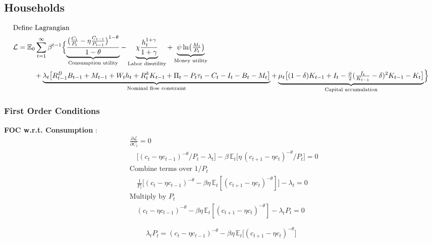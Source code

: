 \documentclass[11pt,preprint]{elsarticle}
\numberwithin{equation}{section}
\numberwithin{figure}{section}
\numberwithin{table}{section}
\begin{document}
\subsection{Households}\label{households-1}

\begin{align*}
  & \text{Define Lagrangian} \\
  & \mathcal{L} = \mathbb{E}_0 \sum_{t=1}^{\infty} \beta^{t-1} \Bigl\{
    \underbrace{\frac{\bigl(\tfrac{C_t}{P_t}-\eta\tfrac{C_{t-1}}{P_{t-1}}\bigr)^{1-\theta}}{1-\theta}}_{\text{Consumption utility}}
    - \underbrace{\chi\frac{h_t^{1+\gamma}}{1+\gamma}}_{\text{Labor disutility}}
    + \underbrace{\psi\ln\bigl(\tfrac{M_t}{P_t}\bigr)}_{\text{Money utility}} \\
  & \quad\qquad
    + \underbrace{\lambda_t\bigl[R^B_{t-1}B_{t-1}+M_{t-1}+W_th_t+R^k_tK_{t-1}+\Pi_t-P_t\tau_t-C_t-I_t-B_t-M_t\bigr]}_{\text{Nominal flow constraint}}
    + \underbrace{\mu_t\bigl[(1-\delta)K_{t-1}+I_t-\tfrac{\phi}{2}(\tfrac{I_t}{K_{t-1}}-\delta)^2K_{t-1}-K_t\bigr]}_{\text{Capital accumulation}}
  \Bigr\}
\end{align*}

\subsubsection{\texorpdfstring{First Order Conditions
\label{household_FOC}}{First Order Conditions }}\label{first-order-conditions}

\textbf{FOC w.r.t. Consumption} : \begin{align*}
  & \frac{\partial \mathcal{L}}{\partial C_t} = 0 \\
  & \quad \bigl[(c_t-\eta c_{t-1})^{-\theta}/P_t - \lambda_t\bigr]
    - \beta\,\mathbb{E}_t\bigl[\eta\,(c_{t+1}-\eta c_t)^{-\theta}/P_t\bigr] = 0 \\[6pt]
  & \text{Combine terms over }1/P_t \\
  & \quad \frac{1}{P_t}\bigl[(c_t-\eta c_{t-1})^{-\theta} - \beta\eta\,\mathbb{E}_t[(c_{t+1}-\eta c_t)^{-\theta}]\bigr] - \lambda_t = 0 \\[6pt]
  & \text{Multiply by }P_t \\
  & \quad (c_t-\eta c_{t-1})^{-\theta} - \beta\eta\,\mathbb{E}_t[(c_{t+1}-\eta c_t)^{-\theta}] - \lambda_t P_t = 0
\end{align*}

\begin{equation}\label{foc_C}
\boxed{
  \lambda_t P_t = (c_t-\eta c_{t-1})^{-\theta} - \beta\eta\,\mathbb{E}_t\bigl[(c_{t+1}-\eta c_t)^{-\theta}\bigr]
}
\end{equation}
\end{document}
